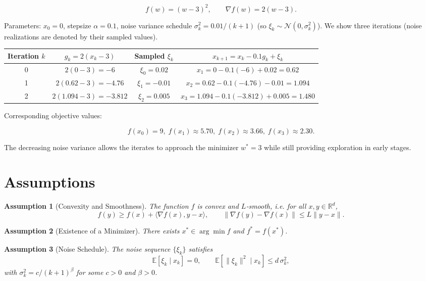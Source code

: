 \documentclass{article}
\newtheorem{assumption}{Assumption}
\newcommand{\E}{\mathbb{E}}
\begin{document}
\[
f(w)=(w-3)^{2},\qquad \nabla f(w)=2(w-3).
\]

Parameters: $x_{0}=0$, stepsize $\alpha=0.1$, noise variance schedule $\sigma_{k}^{2}=0.01/(k+1)$ (so $\xi_{k}\sim\mathcal{N}(0,\sigma_{k}^{2})$).  
We show three iterations (noise realizations are denoted by their sampled values).

\begin{center}
\begin{tabular}{c|c|c|c}
Iteration $k$ & $g_{k}=2(x_{k}-3)$ & Sampled $\xi_{k}$ & $x_{k+1}=x_{k}-0.1g_{k}+\xi_{k}$\\ \hline
0 & $2(0-3)=-6$ & $\xi_{0}=0.02$ & $x_{1}=0-0.1(-6)+0.02=0.62$\\
1 & $2(0.62-3)=-4.76$ & $\xi_{1}=-0.01$ & $x_{2}=0.62-0.1(-4.76)-0.01=1.094$\\
2 & $2(1.094-3)=-3.812$ & $\xi_{2}=0.005$ & $x_{3}=1.094-0.1(-3.812)+0.005=1.480$\\
\end{tabular}
\end{center}

Corresponding objective values:  

\[
f(x_{0})=9,\; f(x_{1})\approx 5.70,\; f(x_{2})\approx 3.66,\; f(x_{3})\approx 2.30.
\]

The decreasing noise variance allows the iterates to approach the minimizer $w^{*}=3$ while still providing exploration in early stages.

\newpage
\section*{Assumptions}
\begin{assumption}[Convexity and Smoothness]\label{ass:convex}
The function $f$ is convex and $L$‑smooth, i.e. for all $x,y\in\mathbb{R}^{d}$,
\[
f(y)\ge f(x)+\langle\nabla f(x),y-x\rangle,
\qquad
\|\nabla f(y)-\nabla f(x)\|\le L\|y-x\|.
\tag{3}
\]
\end{assumption}

\begin{assumption}[Existence of a Minimizer]\label{ass:min}
There exists $x^{*}\in\arg\min f$ and $f^{*}=f(x^{*})$.
\end{assumption}

\begin{assumption}[Noise Schedule]\label{ass:noise}
The noise sequence $\{\xi_{k}\}$ satisfies  
\[
\E[\xi_{k}\mid x_{k}]=0,\qquad
\E[\|\xi_{k}\|^{2}\mid x_{k}]\le d\,\sigma_{k}^{2},
\]
with $\sigma_{k}^{2}=c/(k+1)^{\beta}$ for some $c>0$ and $\beta>0$.
\end{assumption}
\end{document}
